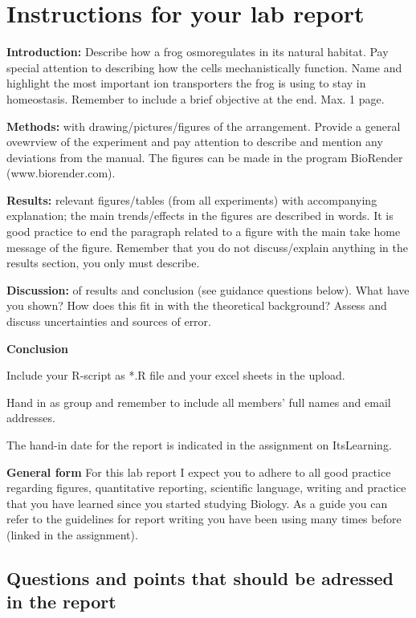 \documentclass[
]{book}
\begin{document}
\chapter{Instructions for your lab report}\label{instructions-for-your-lab-report}

\textbf{Introduction:} Describe how a frog osmoregulates in its natural habitat. Pay special attention to describing how the cells mechanistically function. Name and highlight the most important ion transporters the frog is using to stay in homeostasis. Remember to include a brief objective at the end. Max. 1 page.

\textbf{Methods:} with drawing/pictures/figures of the arrangement. Provide a general ovewrview of the experiment and pay attention to describe and mention any deviations from the manual. The figures can be made in the program BioRender (www.biorender.com).

\textbf{Results:} relevant figures/tables (from all experiments) with accompanying explanation; the main trends/effects in the figures are described in words. It is good practice to end the paragraph related to a figure with the main take home message of the figure. Remember that you do not discuss/explain anything in the results section, you only must describe.

\textbf{Discussion:} of results and conclusion (see guidance questions below). What have you shown? How does this fit in with the theoretical background? Assess and discuss uncertainties and sources of error.

\textbf{Conclusion}

Include your R-script as *.R file and your excel sheets in the upload.

Hand in as group and remember to include all members' full names and email addresses.

The hand-in date for the report is indicated in the assignment on ItsLearning.

\textbf{General form}
For this lab report I expect you to adhere to all good practice regarding figures, quantitative reporting, scientific language, writing and practice that you have learned since you started studying Biology. As a guide you can refer to the guidelines for report writing you have been using many times before (linked in the assignment).

\section{Questions and points that should be adressed in the report}\label{questions-and-points-that-should-be-adressed-in-the-report}
\end{document}

